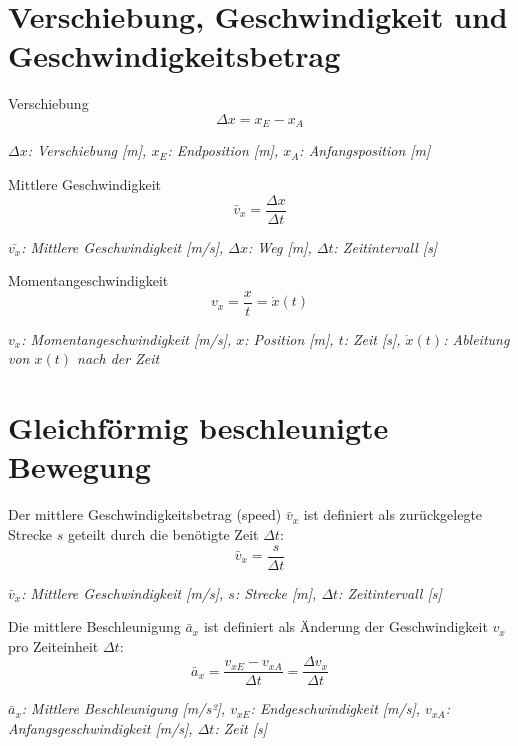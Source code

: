 \documentclass[a4paper,10pt]{article}
\newenvironment{displayformula}
{
	\begin{framed}
		\color{formulaColor}
	}
	{\end{framed}}
\newcommand{\formulalegend}[1]{%
	\par\vspace{0.5ex}%
	{{\color{legendColor}\RaggedRight\small\textit{#1}}}%
	\par\vspace{1.5ex}%
}
\begin{document}
	
\section{Verschiebung, Geschwindigkeit und \\Geschwindigkeitsbetrag}

\begin{displayformula}
	Verschiebung
	\[
	\Delta x = x_E - x_A
	\]
\end{displayformula}
\formulalegend{
	\( \Delta x \): Verschiebung [m], \( x_E \): Endposition [m], \( x_A \): Anfangsposition [m]
}

\begin{displayformula}
	Mittlere Geschwindigkeit
	\[
	\bar{v}_x = \frac{\Delta x}{\Delta t}
	\]
\end{displayformula}
\formulalegend{
	\( \bar{v_x} \): Mittlere Geschwindigkeit [m/s], \( \Delta x \): Weg [m], \( \Delta t \): Zeitintervall [s]
}

\begin{displayformula}
	Momentangeschwindigkeit
	\[
	v_x = \dfrac{x}{t} = \dot{x} (t)
	\]
\end{displayformula}
\formulalegend{
	\( v_x \): Momentangeschwindigkeit [m/s], \( x \): Position [m], \( t \): Zeit [s], \( \dot{x}(t) \): Ableitung von \( x(t) \) nach der Zeit
}



\section{Gleichförmig beschleunigte Bewegung}

\begin{displayformula}
	Der mittlere Geschwindigkeitsbetrag (speed) \( \bar{v}_x \) ist definiert als zurückgelegte Strecke \( s \) geteilt durch die benötigte Zeit \( \Delta t \):
	\[
	\bar{v}_x = \frac{s}{\Delta t}
	\]
\end{displayformula}
\formulalegend{
	\( \bar{v}_x \): Mittlere Geschwindigkeit [m/s], \( s \): Strecke [m], \( \Delta t \): Zeitintervall [s]
}

\begin{displayformula}
	Die mittlere Beschleunigung \( \bar{a}_x \) ist definiert als Änderung der Geschwindigkeit \( v_x \) pro Zeiteinheit \( \Delta t \):
	\[
	\bar{a}_x = \frac{v_{xE} - v_{xA}}{\Delta t} = \frac{\Delta v_x}{\Delta t}
	\]
\end{displayformula}
\formulalegend{
	\( \bar{a}_x \): Mittlere Beschleunigung [m/s²], \( v_{xE} \): Endgeschwindigkeit [m/s], \( v_{xA} \): Anfangsgeschwindigkeit [m/s], \( \Delta t \): Zeit [s]
}
\end{document}
